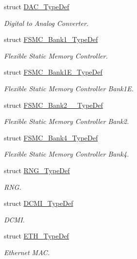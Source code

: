 \begin{DoxyCompactItemize}
struct \hyperlink{struct_d_a_c___type_def}{D\+A\+C\+\_\+\+Type\+Def}
\begin{DoxyCompactList}\small\item\em Digital to Analog Converter. \end{DoxyCompactList}\item 
struct \hyperlink{struct_f_s_m_c___bank1___type_def}{F\+S\+M\+C\+\_\+\+Bank1\+\_\+\+Type\+Def}
\begin{DoxyCompactList}\small\item\em Flexible Static Memory Controller. \end{DoxyCompactList}\item 
struct \hyperlink{struct_f_s_m_c___bank1_e___type_def}{F\+S\+M\+C\+\_\+\+Bank1\+E\+\_\+\+Type\+Def}
\begin{DoxyCompactList}\small\item\em Flexible Static Memory Controller Bank1E. \end{DoxyCompactList}\item 
struct \hyperlink{struct_f_s_m_c___bank2__3___type_def}{F\+S\+M\+C\+\_\+\+Bank2\+\_\+\_\+\+Type\+Def}
\begin{DoxyCompactList}\small\item\em Flexible Static Memory Controller Bank2. \end{DoxyCompactList}\item 
struct \hyperlink{struct_f_s_m_c___bank4___type_def}{F\+S\+M\+C\+\_\+\+Bank4\+\_\+\+Type\+Def}
\begin{DoxyCompactList}\small\item\em Flexible Static Memory Controller Bank4. \end{DoxyCompactList}\item 
struct \hyperlink{struct_r_n_g___type_def}{R\+N\+G\+\_\+\+Type\+Def}
\begin{DoxyCompactList}\small\item\em R\+NG. \end{DoxyCompactList}\item 
struct \hyperlink{struct_d_c_m_i___type_def}{D\+C\+M\+I\+\_\+\+Type\+Def}
\begin{DoxyCompactList}\small\item\em D\+C\+MI. \end{DoxyCompactList}\item 
struct \hyperlink{struct_e_t_h___type_def}{E\+T\+H\+\_\+\+Type\+Def}
\begin{DoxyCompactList}\small\item\em Ethernet M\+AC. \end{DoxyCompactList}\item 

\end{DoxyCompactItemize}
